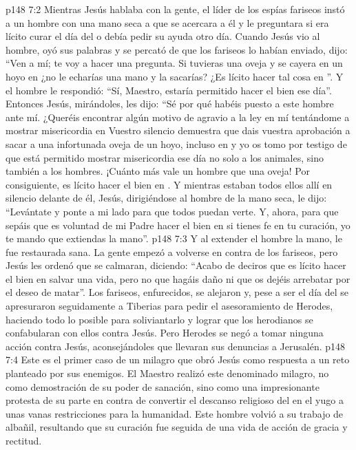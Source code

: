 \vs p148 7:2 Mientras Jesús hablaba con la gente, el líder de los espías fariseos instó a un hombre con una mano seca a que se acercara a él y le preguntara si era lícito curar el día del  o debía pedir su ayuda otro día. Cuando Jesús vio al hombre, oyó sus palabras y se percató de que los fariseos lo habían enviado, dijo: “Ven a mí; te voy a hacer una pregunta. Si tuvieras una oveja y se cayera en un hoyo en  ¿no le echarías una mano y la sacarías? ¿Es lícito hacer tal cosa en ”. Y el hombre le respondió: “Sí, Maestro, estaría permitido hacer el bien ese día”. Entonces Jesús, mirándoles, les dijo: “Sé por qué habéis puesto a este hombre ante mí. ¿Queréis encontrar algún motivo de agravio a la ley en mí tentándome a mostrar misericordia en  Vuestro silencio demuestra que dais vuestra aprobación a sacar a una infortunada oveja de un hoyo, incluso en  y yo os tomo por testigo de que está permitido mostrar misericordia ese día no solo a los animales, sino también a los hombres. ¡Cuánto más vale un hombre que una oveja! Por consiguiente, es lícito hacer el bien en . Y mientras estaban todos ellos allí en silencio delante de él, Jesús, dirigiéndose al hombre de la mano seca, le dijo: “Levántate y ponte a mi lado para que todos puedan verte. Y, ahora, para que sepáis que es voluntad de mi Padre hacer el bien en  si tienes fe en tu curación, yo te mando que extiendas la mano”.
\vs p148 7:3 Y al extender el hombre la mano, le fue restaurada sana. La gente empezó a volverse en contra de los fariseos, pero Jesús les ordenó que se calmaran, diciendo: “Acabo de deciros que es lícito hacer el bien en  salvar una vida, pero no que hagáis daño ni que os dejéis arrebatar por el deseo de matar”. Los fariseos, enfurecidos, se alejaron y, pese a ser el día del  se apresuraron seguidamente a Tiberias para pedir el asesoramiento de Herodes, haciendo todo lo posible para soliviantarlo y lograr que los herodianos se confabularan con ellos contra Jesús. Pero Herodes se negó a tomar ninguna acción contra Jesús, aconsejándoles que llevaran sus denuncias a Jerusalén.
\vs p148 7:4 Este es el primer caso de un milagro que obró Jesús como respuesta a un reto planteado por sus enemigos. El Maestro realizó este denominado milagro, no como demostración de su poder de sanación, sino como una impresionante protesta de su parte en contra de convertir el descanso religioso del  en el yugo a unas vanas restricciones para la humanidad. Este hombre volvió a su trabajo de albañil, resultando que su curación fue seguida de una vida de acción de gracia y rectitud.
